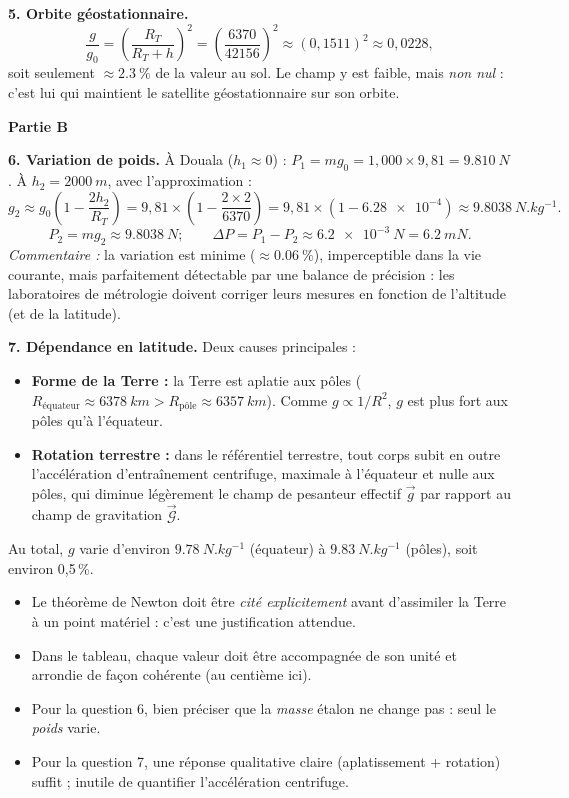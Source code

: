 \documentclass[11pt]{article}
\begin{document}
\begin{corrige}
\textbf{5. Orbite géostationnaire.}
\[
\frac{g}{g_0} = \left(\frac{R_T}{R_T+h}\right)^2 = \left(\frac{6370}{42156}\right)^2 \approx (0,1511)^2 \approx 0,0228,
\]
soit seulement $\approx \SI{2,3}{\%}$ de la valeur au sol. Le champ y est faible, mais \emph{non nul} : c'est lui qui maintient le satellite géostationnaire sur son orbite.

\textbf{Partie B}

\textbf{6. Variation de poids.} À Douala ($h_1 \approx 0$) : $P_1 = m g_0 = 1,000\times 9,81 = \SI{9,810}{N}$.
À $h_2 = \SI{2000}{m}$, avec l'approximation :
\[
g_2 \approx g_0\left(1-\frac{2h_2}{R_T}\right) = 9,81\times\left(1-\frac{2\times 2}{6370}\right) = 9,81\times(1-\num{6,28e-4}) \approx \SI{9,8038}{N.kg^{-1}}.
\]
\[
P_2 = m g_2 \approx \SI{9,8038}{N} ; \qquad \Delta P = P_1 - P_2 \approx \SI{6,2e-3}{N} = \SI{6,2}{mN}.
\]
\emph{Commentaire :} la variation est minime ($\approx \SI{0,06}{\%}$), imperceptible dans la vie courante, mais parfaitement détectable par une balance de précision : les laboratoires de métrologie doivent corriger leurs mesures en fonction de l'altitude (et de la latitude).

\textbf{7. Dépendance en latitude.} Deux causes principales :
\begin{itemize}
\item \textbf{Forme de la Terre :} la Terre est aplatie aux pôles ($R_{\text{équateur}} \approx \SI{6378}{km} > R_{\text{pôle}} \approx \SI{6357}{km}$). Comme $g \propto 1/R^2$, $g$ est plus fort aux pôles qu'à l'équateur.
\item \textbf{Rotation terrestre :} dans le référentiel terrestre, tout corps subit en outre l'accélération d'entraînement centrifuge, maximale à l'équateur et nulle aux pôles, qui diminue légèrement le champ de pesanteur effectif $\vec{g}$ par rapport au champ de gravitation $\vec{\mathcal{G}}$.
\end{itemize}
Au total, $g$ varie d'environ $\SI{9,78}{N.kg^{-1}}$ (équateur) à $\SI{9,83}{N.kg^{-1}}$ (pôles), soit environ 0,5\,\%.

\begin{attention}
\begin{itemize}
\item Le théorème de Newton doit être \emph{cité explicitement} avant d'assimiler la Terre à un point matériel : c'est une justification attendue.
\item Dans le tableau, chaque valeur doit être accompagnée de son unité et arrondie de façon cohérente (au centième ici).
\item Pour la question 6, bien préciser que la \emph{masse} étalon ne change pas : seul le \emph{poids} varie.
\item Pour la question 7, une réponse qualitative claire (aplatissement + rotation) suffit ; inutile de quantifier l'accélération centrifuge.
\end{itemize}
\end{attention}
\end{corrige}
\end{document}
